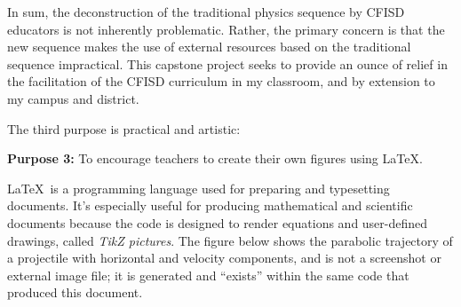 \documentclass[12pt]{article}
\begin{document}
In sum, the deconstruction of the traditional physics sequence by CFISD educators is not inherently problematic. Rather, the primary concern is that the new sequence makes the use of external resources based on the traditional sequence impractical. This capstone project seeks to provide an ounce of relief in the facilitation of the CFISD curriculum in my classroom, and by extension to my campus and district. 

The third purpose is practical and artistic:

\begin{mdframed}[backgroundcolor=black!20]
    \textbf{Purpose 3:} To encourage teachers to create their own figures using \LaTeX.
\end{mdframed}

\LaTeX\ is a programming language used for preparing and typesetting documents. It's especially useful for producing mathematical and scientific documents because the code is designed to render equations and user-defined drawings, called \textit{TikZ pictures}. The figure below shows the parabolic trajectory of a projectile with horizontal and velocity components, and is not a screenshot or external image file; it is generated and ``exists'' within the same code that produced this document. 

\begin{center}
\end{center}
\end{document}
